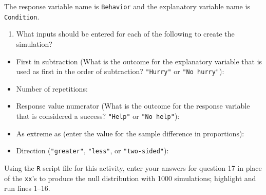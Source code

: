 \documentclass[
]{report}
\providecommand{\tightlist}{%
  \setlength{\itemsep}{0pt}\setlength{\parskip}{0pt}}
\begin{document}
The response variable name is \texttt{Behavior} and the explanatory variable name is \texttt{Condition}.

\begin{enumerate}
\def\labelenumi{\arabic{enumi}.}
\setcounter{enumi}{15}
\tightlist
\item
  What inputs should be entered for each of the following to create the simulation?
  \vspace{1mm}
\end{enumerate}

\begin{itemize}
\tightlist
\item
  First in subtraction (What is the outcome for the explanatory variable that is used as first in the order of subtraction? \texttt{"Hurry"} or \texttt{"No\ hurry"}):
\end{itemize}

\vspace{.15in}

\begin{itemize}
\tightlist
\item
  Number of repetitions:
\end{itemize}

\vspace{.15in}

\begin{itemize}
\tightlist
\item
  Response value numerator (What is the outcome for the response variable that is considered a success? \texttt{"Help"} or \texttt{"No\ help"}):
\end{itemize}

\vspace{.15in}

\begin{itemize}
\tightlist
\item
  As extreme as (enter the value for the sample difference in proportions):
\end{itemize}

\vspace{.15in}

\begin{itemize}
\tightlist
\item
  Direction (\texttt{"greater"}, \texttt{"less"}, or \texttt{"two-sided"}):
\end{itemize}

\vspace{.15in}

Using the \texttt{R} script file for this activity, enter your answers for question 17 in place of the \texttt{xx}'s to produce the null distribution with 1000 simulations; highlight and run lines 1--16.
\end{document}
